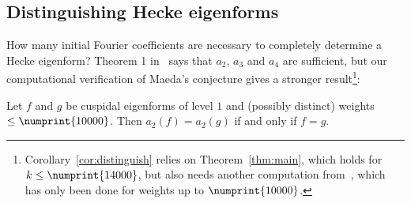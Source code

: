 \documentclass{book}
\newcommand{\bound}{\numprint{14000}}
\begin{document}
\subsection{Distinguishing Hecke eigenforms}

How many initial Fourier coefficients are necessary to completely determine a
Hecke eigenform?  Theorem 1 in~\cite{Ghitza} says that $a_2$, $a_3$ and $a_4$
are sufficient, but our computational verification of Maeda's conjecture gives
a stronger result\footnote{Corollary~\ref{cor:distinguish} relies on
Theorem~\ref{thm:main}, which holds for $k\leq\bound$, but also needs another
computation from~\cite{Ghitza}, which has only been done for weights up to
$\numprint{10000}$.}:

\begin{corollary}
  \label{cor:distinguish}
  Let $f$ and $g$ be cuspidal eigenforms of level $1$ and (possibly distinct)
  weights
  $\leq\numprint{10000}$.  Then $a_2(f)=a_2(g)$ if and only if $f=g$.
\end{corollary}
\end{document}
